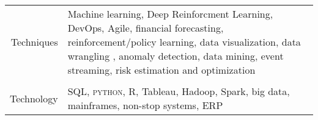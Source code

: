 \documentclass[10pt]{article} %
\begin{document}
\begin{minipage}[t]{0.44\textwidth}
\begin{tabular}{rl}
\parbox{0.3\textwidth}{Techniques}
& \parbox{0.5\textwidth}{Machine learning, Deep Reinforcment Learning,  DevOps, Agile, financial forecasting,  reinforcement/policy learning, data visualization,  data wrangling , anomaly detection, data mining, event streaming, risk estimation and optimization}\\ 
& \\
\parbox{0.3\textwidth}{Technology}
& \parbox{0.5\textwidth}{SQL, \textsc{python}, R, Tableau, Hadoop, Spark, big data, mainframes, non-stop systems,  ERP  }\\
\end{tabular}






\end{minipage} %
\end{document}
